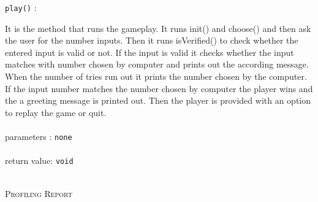 \documentclass{report}
\begin{document}
\begin{flushleft}
\texttt{play()}
\textsf{ : }
\end{flushleft}
\begin{flushright}
\hfill\begin{minipage}{0.85\linewidth}
	\textsf{		It is the method that runs the gameplay. It runs init() and choose() and then ask the user for the number inputs. Then it runs isVerified() to check whether the entered input is valid or not. If the input is valid it checks whether the input matches with number chosen by computer and prints out the according message. When the number of tries run out it prints the number chosen by the computer. If the input number matches the number chosen by computer the player wins and the a greeting message is printed out. Then the player is provided with an option to replay the game or quit.} \\ \\
	\textsf{parameters : }
	\texttt{none} \\ \\
	\textsf{return value: }
	\texttt{void} \\ \\
\end{minipage}
\end{flushright}

\hfill

\begin{center}
	\textsc{\LARGE{Profiling Report}}
\end{center}

\hfill
\end{document}
